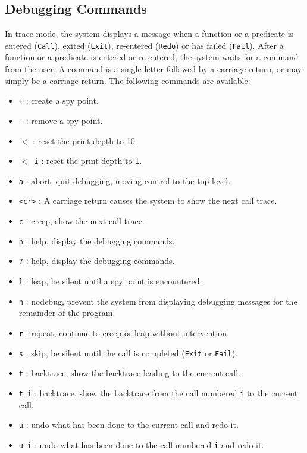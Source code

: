 \subsection{Debugging Commands}
In trace mode, the system displays a message when a function or a predicate is entered (\texttt{Call}), exited (\texttt{Exit}), re-entered (\texttt{Redo}) or has failed (\texttt{Fail}).  After a function or a predicate is entered or re-entered, the system waits for a command from the user. A command is a single letter followed by a carriage-return, or may simply be a carriage-return. The following commands are available:  
\begin{itemize}
\item \texttt{+} : create a spy point.
\item \texttt{-} : remove a spy point.
\item \texttt{$<$} : reset the print depth to 10.
\item \texttt{$<$ i} : reset the print depth to \texttt{i}.
\item \texttt{a} : abort, quit debugging, moving control to the top level.
\item \texttt{<cr>} : A carriage return causes the system to show the next call trace. 
\item \texttt{c} :  creep, show the next call trace.
\item \texttt{h} : help, display the debugging commands.
\item \texttt{?} : help, display the debugging commands.
\item \texttt{l} :  leap, be silent until a spy point is encountered. 
\item \texttt{n} : nodebug, prevent the system from displaying debugging messages for the remainder of the program.
\item \texttt{r} : repeat, continue to creep or leap without intervention. 
\item \texttt{s} : skip, be silent until the call is completed (\texttt{Exit} or \texttt{Fail}). 
\item \texttt{t} : backtrace, show the backtrace leading to the current call.
\item \texttt{t i} : backtrace, show the backtrace from the call numbered \texttt{i} to the current call.
\item \texttt{u} : undo what has been done to the current call and redo it.
\item \texttt{u i} : undo what has been done to the call numbered \texttt{i} and redo it.
\end{itemize}


